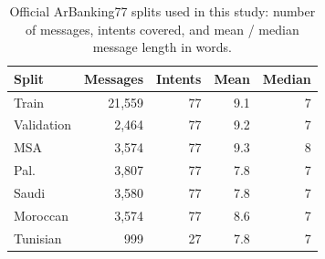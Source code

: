 \begin{table}[t]\centering\small\caption{Official ArBanking77 splits used in this study: number of messages, intents covered, and mean / median message length in words.}\label{tab:data}
\begin{tabular}{lrrrr}\toprule
Split & Messages & Intents & Mean & Median \\\midrule
Train & 21{,}559 & 77 & 9.1 & 7 \\
Validation & 2{,}464 & 77 & 9.2 & 7 \\
MSA & 3{,}574 & 77 & 9.3 & 8 \\
Pal. & 3{,}807 & 77 & 7.8 & 7 \\
Saudi & 3{,}580 & 77 & 7.8 & 7 \\
Moroccan & 3{,}574 & 77 & 8.6 & 7 \\
Tunisian & 999 & 27 & 7.8 & 7 \\
\bottomrule\end{tabular}\end{table}
